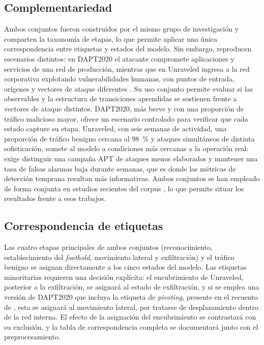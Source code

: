 \subsection{Complementariedad}
Ambos conjuntos fueron construidos por el mismo grupo de investigación y comparten la taxonomía de etapas, lo que permite aplicar una única correspondencia entre etiquetas y estados del modelo. Sin embargo, reproducen escenarios distintos: en DAPT2020 el atacante compromete aplicaciones y servicios de una red de producción, mientras que en Unraveled ingresa a la red corporativa explotando vulnerabilidades humanas, con puntos de entrada, orígenes y vectores de ataque diferentes \parencite{myneni2023unraveled}. Su uso conjunto permite evaluar si las observables y la estructura de transiciones aprendidas se sostienen frente a vectores de ataque distintos. DAPT2020, más breve y con una proporción de tráfico malicioso mayor, ofrece un escenario controlado para verificar que cada estado capture su etapa. Unraveled, con seis semanas de actividad, una proporción de tráfico benigno cercana al 98~\% y ataques simultáneos de distinta sofisticación, somete al modelo a condiciones más cercanas a la operación real: exige distinguir una campaña APT de ataques menos elaborados y mantener una tasa de falsas alarmas baja durante semanas, que es donde las métricas de detección temprana resultan más informativas. Ambos conjuntos se han empleado de forma conjunta en estudios recientes del corpus \parencite{mamun_limitations_2024,rivas_analysis_2025,k_advanced_2026}, lo que permite situar los resultados frente a esos trabajos.

\subsection{Correspondencia de etiquetas}
Las cuatro etapas principales de ambos conjuntos (reconocimiento, establecimiento del \textit{foothold}, movimiento lateral y exfiltración) y el tráfico benigno se asignan directamente a los cinco estados del modelo. Las etiquetas minoritarias requieren una decisión explícita: el encubrimiento de Unraveled, posterior a la exfiltración, se asignará al estado de exfiltración, y si se emplea una versión de DAPT2020 que incluya la etiqueta de \textit{pivoting}, presente en el recuento de \textcite{mamun_limitations_2024}, esta se asignará al movimiento lateral, por tratarse de desplazamiento dentro de la red interna. El efecto de la asignación del encubrimiento se contrastará con su exclusión, y la tabla de correspondencia completa se documentará junto con el preprocesamiento.

